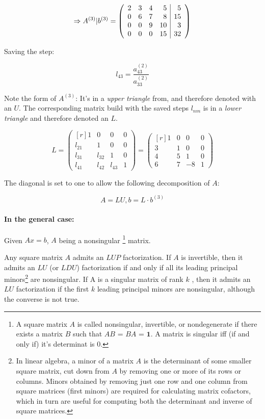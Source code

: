 \[
	\Rightarrow
	A^{(3)}|b^{(3)} = 
	\left(\begin{array}{r r r r | r}
			2 & 3 &  4 &  5 &  5 \\
			0 & 6 &  7 &  8 & 15 \\
			0 & 0 &  9 & 10 &  3 \\
			0 & 0 &  0 & 15 & 32
	\end{array}\right)
\]

Saving the step:

\[
	l_{43} = \frac{a_{43}^{(2)}}{a_{33}^{(2)}}
\]

Note the form of $A^{(3)}$: It's in a \textit{upper triangle} from, and therefore
denoted with an $U$. The corresponding matrix build with the saved steps $l_{nm}$ is in a
\textit{lower triangle} and therefore denoted an $L$.

\[L = \begin{pmatrix*}[r]
	1      &      0 &      0 & 0 \\
	l_{21} &      1 &      0 & 0 \\
	l_{31} & l_{32} &      1 & 0 \\
	l_{41} & l_{42} & l_{43} & 1
\end{pmatrix*} =
\begin{pmatrix*}[r]
	1 & 0 & 0 & 0 \\
	3 & 1 & 0 & 0 \\
	4 & 5 & 1 & 0 \\
	6 & 7 & -8 & 1	
\end{pmatrix*}
\]

The diagonal is set to one to allow the following decomposition of $A$:

\[
	A = LU, b = L \cdot b^{(3)}
\]


\paragraph{In the general case:} Given $Ax = b$, $A$ being a nonsingular
\footnote{A square matrix $A$ is called nonsingular, invertible, or 
nondegenerate if there exists a matrix $B$ such that $AB$ = $BA$ = $\mathbf{1}$.
A matrix is singular iff (if and only if) it's determinat is 0.} matrix.

Any square matrix $A$ admits an $LUP$ factorization. If $A$ is invertible, 
then it admits an $LU$ (or $LDU$) factorization if and only if all its leading 
principal minors\footnote{In linear algebra, a minor of a matrix $A$ is the 
determinant of some smaller square matrix, cut down from $A$ by removing one or 
more of its rows or columns. Minors obtained by removing just one row and one 
column from square matrices (first minors) are required for calculating matrix 
cofactors, which in turn are useful for computing both the determinant and 
inverse of square matrices.} are nonsingular. If A is a singular matrix of rank $k$ , 
then it admits an $LU$ factorization if the first $k$ leading principal minors 
are nonsingular, although the converse is not true.

